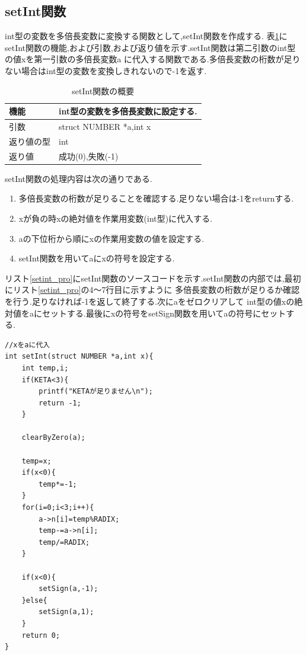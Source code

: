 \documentclass[a4j] {jarticle}
\begin{document}
\subsection{setInt関数}
int型の変数を多倍長変数に変換する関数として,setInt関数を作成する.
表\ref{setInt}にsetInt関数の機能,および引数,および返り値を示す.setInt関数は第二引数のint型の値xを第一引数の多倍長変数a
に代入する関数である.多倍長変数の桁数が足りない場合はint型の変数を変換しきれないので-1を返す.
\begin{table}[H]
  \caption{setInt関数の概要}
  \label{setInt}
  \begin{center}
      \begin{tabular}{|l|l|}\hline
      機能 & int型の変数を多倍長変数に設定する.\\ \hline
      引数 & struct NUMBER *a,int x\\ \hline
      返り値の型 & int\\ \hline
      返り値 & 成功(0),失敗(-1)\\ \hline
      \end{tabular}
  \end{center}
  \end{table}

  setInt関数の処理内容は次の通りである.
  \begin{enumerate}
    \item 多倍長変数の桁数が足りることを確認する.足りない場合は-1をreturnする.
    \item xが負の時xの絶対値を作業用変数(int型)に代入する.
    \item aの下位桁から順にxの作業用変数の値を設定する.
    \item setInt関数を用いてaにxの符号を設定する.
  \end{enumerate}

  リスト\ref{setint_pro}にsetInt関数のソースコードを示す.setInt関数の内部では,最初にリスト\ref{setint_pro}の4～7行目に示すように
多倍長変数の桁数が足りるか確認を行う.足りなければ-1を返して終了する.次にaをゼロクリアして
int型の値xの絶対値をaにセットする.最後にxの符号をsetSign関数を用いてaの符号にセットする.
  \begin{lstlisting}[basicstyle=\ttfamily\footnotesize, frame=single,label=setint_pro,caption=setInt関数のソースコード]
//xをaに代入
int setInt(struct NUMBER *a,int x){
    int temp,i;
    if(KETA<3){
        printf("KETAが足りません\n");
        return -1;
    }

    clearByZero(a);

    temp=x;
    if(x<0){
        temp*=-1;
    }
    for(i=0;i<3;i++){
        a->n[i]=temp%RADIX;
        temp-=a->n[i];
        temp/=RADIX;
    }

    if(x<0){
        setSign(a,-1);
    }else{
        setSign(a,1);
    }
    return 0;
}
\end{lstlisting}
\end{document}
